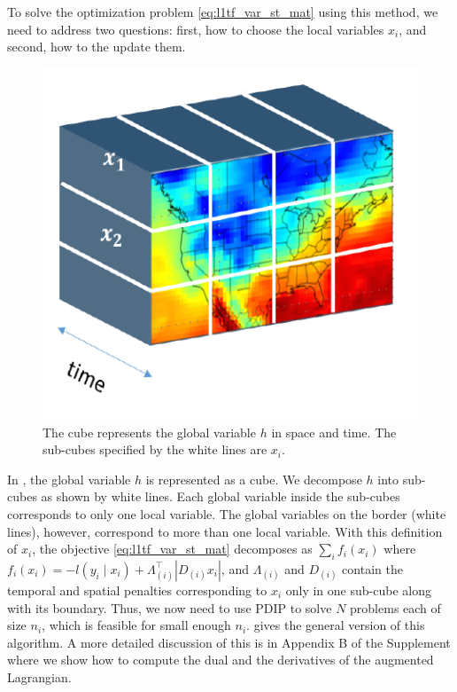 \documentclass[letterpaper]{article} %
\newcommand{\autoref}{\Cref}
\newcommand{\given}{\;\vert\;}
\begin{document}
To solve the optimization problem \eqref{eq:l1tf_var_st_mat} using
this method, we need to address two 
questions: first, how to choose the 
local variables $x_i$, and second, how to the update them.
\begin{figure}[tb]
  \centering
  \includegraphics[width=.6\columnwidth]{Figures/data_cube}
  \caption{The cube represents the global variable $h$ in space and
    time. The sub-cubes specified by the white lines are
    $x_i$.}
  \label{fig:data_cube}
\end{figure} 


In \autoref{fig:data_cube}, the global variable $h$ is represented
as a cube. We decompose $h$
into sub-cubes as shown by white lines. Each global variable inside
the sub-cubes corresponds to only one local variable. The global
variables on the border (white lines), however, correspond to more
than one local variable. With 
this definition of $x_i$, the objective
\eqref{eq:l1tf_var_st_mat} decomposes as $\sum_i f_i(x_i)$ where
$f_i(x_i)=-l(y_i\given x_i)+\Lambda_{(i)}^\top |D_{(i)}x_i|$, and
$\Lambda_{(i)}$ and $D_{(i)}$ contain the temporal and spatial
penalties corresponding to $x_i$ only in one sub-cube along with its
boundary. Thus, we now need to use PDIP to solve $N$ problems each of
size $n_i$, which is feasible for small enough
$n_i$. \autoref{alg:conADMM} gives the general version of this
algorithm. A more detailed discussion of this is in Appendix B of the
Supplement where we show how to compute the dual and the derivatives
of the augmented Lagrangian.  
\end{document}
